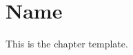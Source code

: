 \chapter{Name}
\label{name}
\setcounter{secnumdepth}{0}
\minitoc
This is the chapter template.
\clearpage

%
